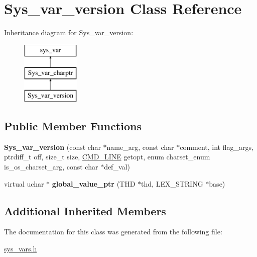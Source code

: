 \hypertarget{classSys__var__version}{}\section{Sys\+\_\+var\+\_\+version Class Reference}
\label{classSys__var__version}
Inheritance diagram for Sys\+\_\+var\+\_\+version\+:\begin{figure}[H]
\begin{center}
\leavevmode
\includegraphics[height=3.000000cm]{classSys__var__version}
\end{center}
\end{figure}
\subsection*{Public Member Functions}
\begin{DoxyCompactItemize}
\item 
\mbox{\label{classSys__var__version_aa4b7a7266c30717e26d80b989ff40475}} 
{\bfseries Sys\+\_\+var\+\_\+version} (const char $\ast$name\+\_\+arg, const char $\ast$comment, int flag\+\_\+args, ptrdiff\+\_\+t off, size\+\_\+t size, \mbox{\hyperlink{structCMD__LINE}{C\+M\+D\+\_\+\+L\+I\+NE}} getopt, enum charset\+\_\+enum is\+\_\+os\+\_\+charset\+\_\+arg, const char $\ast$def\+\_\+val)
\item 
\mbox{\label{classSys__var__version_aab4b48f114ad2340f5c8e652a6473b3b}} 
virtual uchar $\ast$ {\bfseries global\+\_\+value\+\_\+ptr} (T\+HD $\ast$thd, L\+E\+X\+\_\+\+S\+T\+R\+I\+NG $\ast$base)
\end{DoxyCompactItemize}
\subsection*{Additional Inherited Members}


The documentation for this class was generated from the following file\+:\begin{DoxyCompactItemize}
\item 
\mbox{\hyperlink{sys__vars_8h}{sys\+\_\+vars.\+h}}\end{DoxyCompactItemize}
